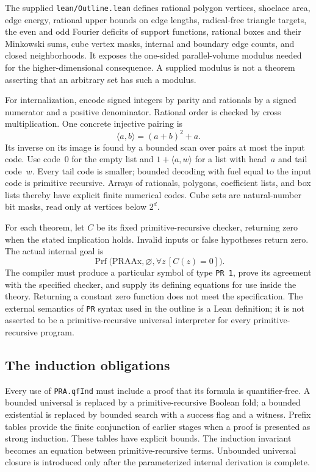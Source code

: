 The supplied \texttt{lean/Outline.lean} defines rational polygon vertices,
shoelace area, edge energy, rational upper bounds on edge lengths,
radical-free triangle targets, the even and odd Fourier deficits of support
functions, rational boxes and their Minkowski sums, cube vertex masks,
internal and boundary edge counts, and closed neighborhoods.  It exposes
the one-sided parallel-volume modulus needed for the higher-dimensional
consequence.  A supplied modulus is not a theorem asserting that an
arbitrary set has such a modulus.

For internalization, encode signed integers by parity and rationals by a
signed numerator and a positive denominator.  Rational order is checked
by cross multiplication.  One concrete injective pairing is
\[
 \langle a,b\rangle=(a+b)^2+a.
\]
Its inverse on its image is found by a bounded scan over pairs at most
the input code.  Use code~$0$ for the empty list and
$1+\langle a,w\rangle$ for a list with head~$a$ and tail code~$w$.
Every tail code is smaller; bounded decoding with fuel equal to the input
code is primitive recursive.  Arrays of rationals, polygons, coefficient
lists, and box lists thereby have explicit finite numerical codes.
Cube sets are natural-number bit masks, read only at vertices below $2^d$.

For each theorem, let $C$ be its fixed primitive-recursive checker, returning
zero when the stated implication holds.  Invalid inputs or false hypotheses
return zero.  The actual internal goal is
\[
 \operatorname{Prf}\bigl(\mathrm{PRAAx},\varnothing,
                         \forall z\,[C(z)=0]\bigr).
\]
The compiler must produce a particular symbol of type \texttt{PR 1},
prove its agreement with the specified checker, and supply its defining
equations for use inside the theory.  Returning a constant zero function
does not meet the specification.  The external semantics of \texttt{PR}
syntax used in the outline is a Lean definition; it is not asserted to be
a primitive-recursive universal interpreter for every primitive-recursive
program.

\subsection{The induction obligations}

Every use of \texttt{PRA.qfInd} must include a proof that its formula is
quantifier-free.  A bounded universal is replaced by a primitive-recursive
Boolean fold; a bounded existential is replaced by bounded search with
a success flag and a witness.  Prefix tables provide the finite conjunction
of earlier stages when a proof is presented as strong induction.  These
tables have explicit bounds.  The induction invariant becomes an equation
between primitive-recursive terms.  Unbounded universal closure is introduced
only after the parameterized internal derivation is complete.

